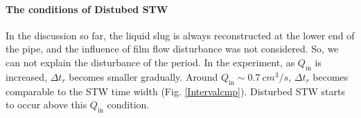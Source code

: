 \documentclass[aps,pre,preprint,groupedaddress,showkeys]{revtex4-2}
\begin{document}




\paragraph{The conditions of Distubed STW}
In the discussion so far, the liquid slug is always reconstructed at the lower end of the pipe, and the influence of film flow disturbance was not considered. 
So, we can not explain the disturbance of the period.
In the experiment, as $ Q_ \mathrm {in} $ is increased, $ \Delta t_r $ becomes smaller gradually. 
Around $ Q_ \mathrm{in} \sim \SI{0.7} {cm^ 3 / s}$, $ \Delta t_r $ becomes comparable to the STW time width (Fig. \ref{Intervalcmp}).
Disturbed STW starts to occur above this $ Q_ \mathrm {in} $ condition.
\end{document}
